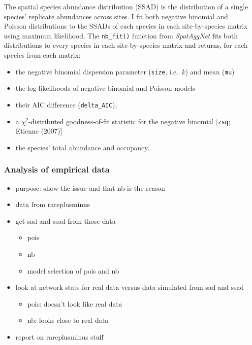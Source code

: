 \documentclass[
  letterpaper,
  DIV=11,
  numbers=noendperiod]{scrartcl}
\providecommand{\tightlist}{%
  \setlength{\itemsep}{0pt}\setlength{\parskip}{0pt}}
\begin{document}
The spatial species abundance distribution (SSAD) is the distribution of
a single species' replicate abundances across sites. I fit both negative
binomial and Poisson distributions to the SSADs of each species in each
site-by-species matrix using maximum likelihood. The \texttt{nb\_fit()}
function from \emph{SpatAggNet} fits both distributions to every species
in each site-by-species matrix and returns, for each species from each
matrix:

\begin{itemize}
\tightlist
\item
  the negative binomial dispersion parameter (\texttt{size}, i.e.~\(k\))
  and mean (\texttt{mu})
\item
  the log-likelihoods of negative binomial and Poisson models
\item
  their AIC difference (\texttt{delta\_AIC}),
\item
  a \(\chi^2\)-distributed goodness-of-fit statistic for the negative
  binomial {[}\texttt{zsq}; Etienne (2007){]}
\item
  the species' total abundance and occupancy.
\end{itemize}

\subsubsection{Analysis of empirical
data}\label{analysis-of-empirical-data}

\begin{itemize}
\tightlist
\item
  purpose: show the issue and that nb is the reason
\item
  data from rareplusminus
\item
  get sad and ssad from those data

  \begin{itemize}
  \tightlist
  \item
    pois
  \item
    nb
  \item
    model selection of pois and nb
  \end{itemize}
\item
  look at network stats for real data versus data simulated from sad and
  ssad

  \begin{itemize}
  \tightlist
  \item
    pois: doesn't look like real data
  \item
    nb: looks close to real data
  \end{itemize}
\item
  report on rareplusminus stuff
\end{itemize}
\end{document}
